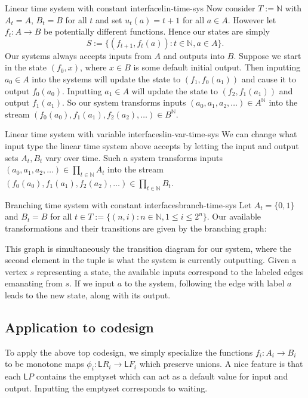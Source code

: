 \documentclass[12pt, a4paper]{article}
\theoremstyle{definition}
\theoremstyle{plain}
\theoremstyle{plain}
\theoremstyle{plain}
\theoremstyle{plain}
\theoremstyle{plain}
\theoremstyle{remark}
\theoremstyle{remark}
\newcommand{\low}{\mathsf{L}}
\begin{document}
\begin{tcexample}{Linear time system with constant interface}{lin-time-sys}
    Now consider $T := \mathbb{N}$ with $A_t = A$, $B_t = B$ for all $t$ and set $u_t(a) = t+1$ for all $a \in A$. However let $f_t: A \rightarrow B$ be potentially different functions. Hence our states are simply $$ S := \{ (f_{t+1}, f_t(a)) : t \in \mathbb{N}, a \in A\}.$$
    Our systems always accepts inputs from $A$ and outputs into $B$. Suppose we start in the state $(f_0,x)$, where $x \in B$ is some default initial output. Then inputting $a_0 \in A$ into the systems will update the state to $(f_1,f_0(a_1))$ and cause it to output $f_0(a_0)$. Inputting $a_1 \in A$ will update the state to $(f_2,f_1(a_1))$ and output $f_1(a_1)$. So our system transforms inputs $(a_0, a_1, a_2, \ldots) \in A^{\mathbb{N}}$ into the stream $(f_0(a_0), f_1(a_1), f_2(a_2), \ldots)\in B^{\mathbb{N}}$.
\end{tcexample}

\begin{tcexample}{Linear time system with variable interfaces}{lin-var-time-sys}
    We can change what input type the linear time system above accepts by letting the input and output sets $A_t, B_t$ vary over time. Such a system transforms inputs $(a_0, a_1, a_2, \ldots) \in \prod_{t \in \mathbb{N}} A_t$ into the stream $(f_0(a_0), f_1(a_1), f_2(a_2), \ldots)\in \prod_{t \in \mathbb{N}} B_t$.
\end{tcexample}

\begin{tcexample}{Branching time system with constant interfaces}{branch-time-sys}
    Let $A_t = \{0,1\}$ and $B_t = B$ for all $t \in T := \{(n,i) : n \in \mathbb{N}, 1 \leq i \leq 2^n \}$. Our available transformations and their transitions are given by the branching graph:

    This graph is simultaneously the transition diagram for our system, where the second element in the tuple is what the system is currently outputting. Given a vertex $s$ representing a state, the available inputs correspond to the labeled edges emanating from $s$. If we input $a$ to the system, following the edge with label $a$ leads to the new state, along with its output.
\end{tcexample}

\subsection{Application to codesign}
To apply the above top codesign, we simply specialize the functions $f_i: A_i \rightarrow B_i$ to be monotone maps $\phi_i: \low R_i \rightarrow \low F_i$ which preserve unions. A nice feature is that each $\low P$ contains the emptyset which can act as a default value for input and output. Inputting the emptyset corresponds to waiting.
\end{document}

